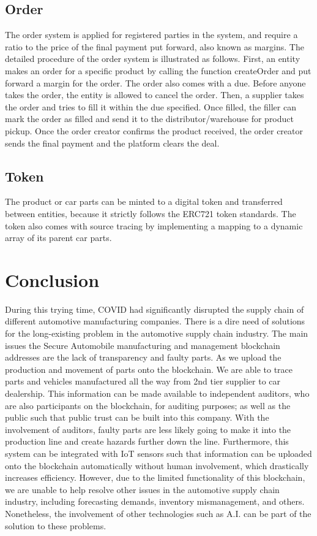 \documentclass[12pt]{article}
\begin{document}
\subsection{Order}
The order system is applied for registered parties in the system, and require a ratio to the price of the final payment put forward, also known as margins. The detailed procedure of the order system is illustrated as follows. First, an entity makes an order for a specific product by calling the function createOrder and put forward a margin for the order. The order also comes with a due. Before anyone takes the order, the entity is allowed to cancel the order. Then, a supplier takes the order and tries to fill it within the due specified. Once filled, the filler can mark the order as filled and send it to the distributor/warehouse for product pickup. Once the order creator confirms the product received, the order creator sends the final payment and the platform clears the deal.

\subsection{Token}
The product or car parts can be minted to a digital token and transferred between entities, because it strictly follows the ERC721 token standards. The token also comes with source tracing by implementing a mapping to a dynamic array of its parent car parts.

%

\section{Conclusion}
During this trying time, COVID had significantly disrupted the supply chain of different automotive manufacturing companies. There is a dire need of solutions for the long-existing problem in the automotive supply chain industry. The main issues the Secure Automobile manufacturing and management blockchain addresses are the lack of transparency and faulty parts. As we upload the production and movement of parts onto the blockchain. We are able to trace parts and vehicles manufactured all the way from 2nd tier supplier to car dealership. This information can be made available to independent auditors, who are also participants on the blockchain, for auditing purposes; as well as the public such that public trust can be built into this company. With the involvement of auditors, faulty parts are less likely going to make it into the production line and create hazards further down the line. Furthermore, this system can be integrated with IoT sensors such that information can be uploaded onto the blockchain automatically without human involvement, which drastically increases efficiency. However, due to the limited functionality of this blockchain, we are unable to help resolve other issues in the automotive supply chain industry, including forecasting demands, inventory mismanagement, and others. Nonetheless, the involvement of other technologies such as A.I. can be part of the solution to these problems.

\pagebreak



\end{document}
